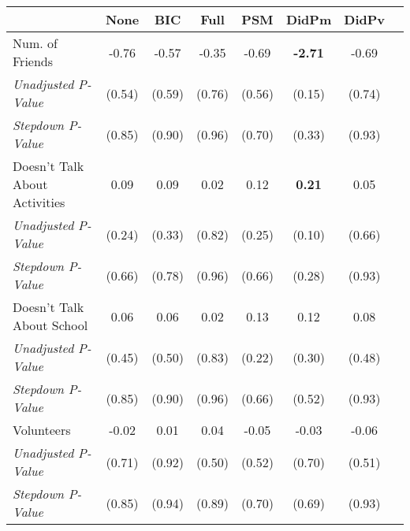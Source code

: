 \begin{tabular}{l c c c c c c c}
\toprule
 & None & BIC & Full & PSM & DidPm & DidPv \\
\midrule
Num. of Friends & -0.76 & -0.57 & -0.35 & -0.69 & \textbf{ -2.71 } & -0.69 \\
\quad \textit{Unadjusted P-Value} & (0.54) & (0.59) & (0.76) & (0.56) & (0.15) & (0.74) \\
\quad \textit{Stepdown P-Value} & (0.85) & (0.90) & (0.96) & (0.70) & (0.33) & (0.93) \\
Doesn't Talk About Activities & 0.09 & 0.09 & 0.02 & 0.12 & \textbf{ 0.21 } & 0.05 \\
\quad \textit{Unadjusted P-Value} & (0.24) & (0.33) & (0.82) & (0.25) & (0.10) & (0.66) \\
\quad \textit{Stepdown P-Value} & (0.66) & (0.78) & (0.96) & (0.66) & (0.28) & (0.93) \\
Doesn't Talk About School & 0.06 & 0.06 & 0.02 & 0.13 & 0.12 & 0.08 \\
\quad \textit{Unadjusted P-Value} & (0.45) & (0.50) & (0.83) & (0.22) & (0.30) & (0.48) \\
\quad \textit{Stepdown P-Value} & (0.85) & (0.90) & (0.96) & (0.66) & (0.52) & (0.93) \\
Volunteers & -0.02 & 0.01 & 0.04 & -0.05 & -0.03 & -0.06 \\
\quad \textit{Unadjusted P-Value} & (0.71) & (0.92) & (0.50) & (0.52) & (0.70) & (0.51) \\
\quad \textit{Stepdown P-Value} & (0.85) & (0.94) & (0.89) & (0.70) & (0.69) & (0.93) \\
\bottomrule
\end{tabular}
